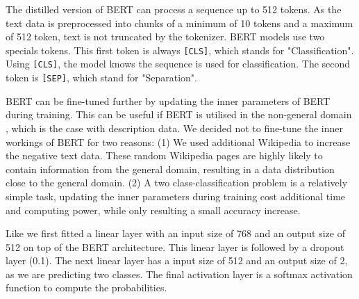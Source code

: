 \documentclass[a4paper, 12pt, oneside]{book} %
\begin{document}
The distilled version of BERT can process a sequence up to 512 tokens.
As the text data is preprocessed into chunks of a minimum of 10 tokens and a maximum of 512 token, text is not truncated by the tokenizer. 
BERT models use two specials tokens.
This first token is always \verb|[CLS]|, which stands for "Classification".
Using \verb|[CLS]|, the model knows the sequence is used for classification.
The second token is \verb|[SEP]|, which stand for "Separation". 

BERT can be fine-tuned further by updating the inner parameters of BERT during training. 
This can be useful if BERT is utilised in the non-general domain \autocite{devlin_bert_2019, sun_how_2020, sanh_distilbert_2020}, which is the case with description data.
We decided not to fine-tune the inner workings of BERT for two reasons: 
(1) We used additional Wikipedia to increase the negative text data.
These random Wikipedia pages are highly likely to contain information from the general
domain, resulting in a  data distribution close to the general domain.
(2) A two class-classification problem is a relatively simple task, updating the inner parameters during training cost additional time and computing power, while only resulting a small accuracy increase.

Like \textcite{sun_how_2020} we first fitted a linear layer with an input size of 768 and an output size of 512 on top of the BERT architecture. 
This linear layer is followed by a dropout layer (0.1).
The next linear layer has a input size of 512 and an output size of 2, as we are predicting two classes.
The final activation layer is a softmax activation function to compute the probabilities.
\end{document}
